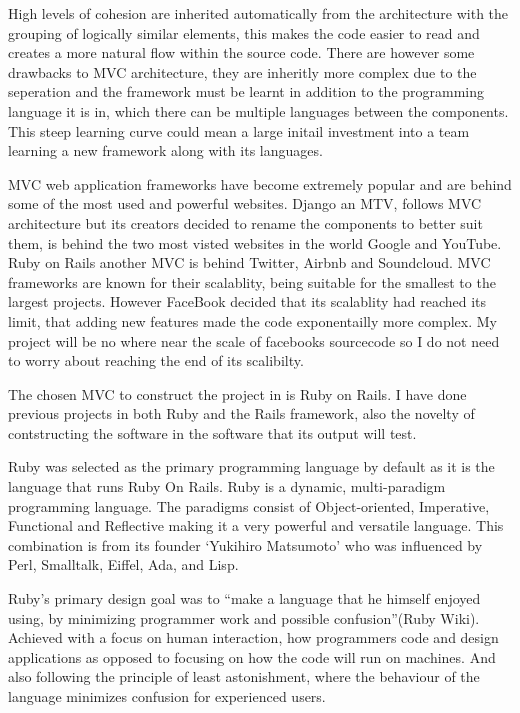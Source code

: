 \documentclass{article}
\begin{document}
\par High levels of cohesion are inherited automatically from the architecture with the grouping of logically similar elements, this makes the code easier to read and creates a more natural flow within the source code. There are however some drawbacks to MVC architecture, they are inheritly more complex due to the seperation and the framework must be learnt in addition to the programming language it is in, which there can be multiple languages between the components. This steep learning curve could mean a large initail investment into a team learning a new framework along with its languages.
\par MVC web application frameworks have become extremely popular and are behind some of the most used and powerful websites. Django an MTV, follows MVC architecture but its creators decided to rename the components \cite{Django} to better suit them, is behind the two most visted websites in the world Google and YouTube\cite{SHUUP}\cite{Alexa}. Ruby on Rails another MVC is behind Twitter, Airbnb and Soundcloud.\cite{Coderfactory} MVC frameworks are known for their scalablity, being suitable for the smallest to the largest projects. However FaceBook decided that its scalablity had reached its limit, that adding new features made the code exponentailly more complex.\cite{Infoq} My project will be no where near the scale of facebooks sourcecode so I do not need to worry about reaching the end of its scalibilty.
\par The chosen MVC to construct the project in is Ruby on Rails. I have done previous projects in both Ruby and the Rails framework, also the novelty of contstructing the software in the software that its output will test.
\par Ruby was selected as the primary programming language by default as it is the language that runs Ruby On Rails. Ruby is a dynamic, multi-paradigm programming language. The paradigms consist of Object-oriented, Imperative, Functional and Reflective making it a very powerful and versatile language. This combination is from its founder ‘Yukihiro Matsumoto’ who was influenced by Perl, Smalltalk, Eiffel, Ada, and Lisp.
\par Ruby’s primary design goal was to “make a language that he himself enjoyed using, by minimizing programmer work and possible confusion”(Ruby Wiki). Achieved with a focus on human interaction, how programmers code and design applications as opposed to focusing on how the code will run on machines. And also following the principle of least astonishment, where the behaviour of the language minimizes confusion for experienced users.
\end{document}
